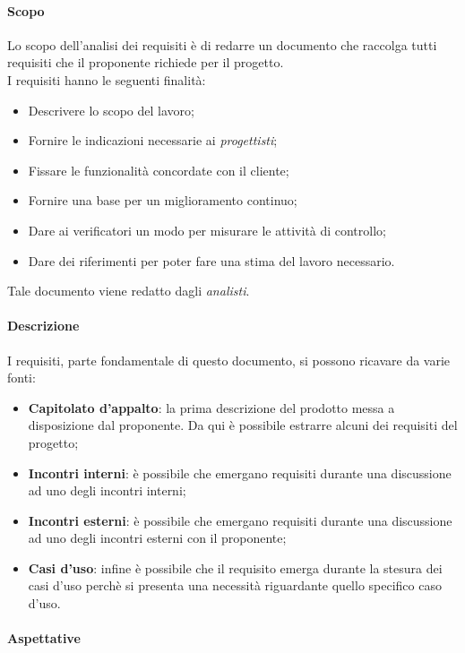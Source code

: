 \documentclass[../norme_di_progetto.tex]{subfiles}
\begin{document}
\paragraph{Scopo}
Lo scopo dell'analisi dei requisiti è di redarre un documento che raccolga tutti requisiti che il proponente richiede per il progetto.\\
I requisiti hanno le seguenti finalità:
\begin{itemize}
    \item Descrivere lo scopo del lavoro;
    \item Fornire le indicazioni necessarie ai \emph{progettisti};
    \item Fissare le funzionalità concordate con il cliente;
    \item Fornire una base per un miglioramento continuo;
    \item Dare ai verificatori un modo per misurare le attività di controllo;
    \item Dare dei riferimenti per poter fare una stima del lavoro necessario.
\end{itemize}
Tale documento viene redatto dagli \emph{analisti}.

\paragraph{Descrizione}
I requisiti, parte fondamentale di questo documento, si possono ricavare da varie fonti:
\begin{itemize}
    \item \textbf{Capitolato d'appalto}: la prima descrizione del prodotto messa a disposizione dal proponente. Da qui è possibile estrarre alcuni dei requisiti del progetto;
    \item \textbf{Incontri interni}: è possibile che emergano requisiti durante una discussione ad uno degli incontri interni;
    \item \textbf{Incontri esterni}: è possibile che emergano requisiti durante una discussione ad uno degli incontri esterni con il proponente;
    \item \textbf{Casi d'uso}: infine è possibile che il requisito emerga durante la stesura dei casi d'uso perchè si presenta una necessità riguardante quello specifico caso d'uso.
\end{itemize}

\paragraph{Aspettative}
\end{document}
